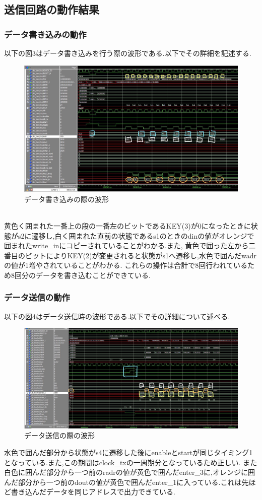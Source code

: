 \documentclass[dvipdfmx]{jarticle}
\begin{document}
\subsection{送信回路の動作結果}
\subsubsection{データ書き込みの動作}
以下の図3はデータ書き込みを行う際の波形である.以下でその詳細を記述する.
\begin{figure}[h]
  \centering
  \includegraphics[width=12cm]{wave_write.jpg}
  \caption{データ書き込みの際の波形}
\end{figure}
\\黄色く囲まれた一番上の段の一番左のビットであるKEY(3)が0になったときに状態がs2に遷移し,白く囲まれた直前の状態であるs1のときのdinの値がオレンジで囲まれたwrite\_inにコピーされていることがわかる.また,
黄色で囲った左から二番目のビットによりKEY(2)が変更されると状態がs1へ遷移し,水色で囲んだwadrの値が1増やされていることがわかる.
これらの操作は合計で8回行われているため8回分のデータを書き込むことができている.
\subsubsection{データ送信の動作}
以下の図4はデータ送信時の波形である.以下でその詳細について述べる.
\clearpage
\begin{figure}[h]
  \centering
  \includegraphics[width=12cm]{wave_send.jpg}
  \caption{データ送信の際の波形}
\end{figure}
水色で囲んだ部分から状態がs4に遷移した後にenableとstartが同じタイミング1となっている.また,この期間はclock\_txの一周期分となっているため正しい.
また白色に囲んだ部分から一つ前のradrの値が黄色で囲んだenter\_3に,オレンジに囲んだ部分から一つ前のdoutの値が黄色で囲んだenter\_1に入っている.これは先ほど書き込んだデータを同じアドレスで出力できている.
\end{document}
